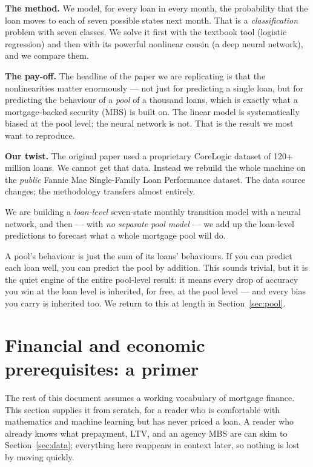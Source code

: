 \documentclass[11pt]{article}
\begin{document}
\textbf{The method.} We model, for every loan in every month, the probability that the
loan moves to each of seven possible states next month. That is a \emph{classification}
problem with seven classes. We solve it first with the textbook tool (logistic
regression) and then with its powerful nonlinear cousin (a deep neural network), and we
compare them.

\textbf{The pay-off.} The headline of the paper we are replicating is that the
nonlinearities matter enormously --- not just for predicting a single loan, but for
predicting the behaviour of a \emph{pool} of a thousand loans, which is exactly what a
mortgage-backed security (MBS) is built on. The linear model is systematically biased at
the pool level; the neural network is not. That is the result we most want to reproduce.

\textbf{Our twist.} The original paper used a proprietary CoreLogic dataset of 120+
million loans. We cannot get that data. Instead we rebuild the whole machine on the
\emph{public} Fannie Mae Single-Family Loan Performance dataset. The data source changes;
the methodology transfers almost entirely.

\begin{keyidea}
We are building a \emph{loan-level} seven-state monthly transition model with a neural
network, and then --- with \emph{no separate pool model} --- we add up the loan-level
predictions to forecast what a whole mortgage pool will do.
\end{keyidea}

\begin{intuition}
A pool's behaviour is just the sum of its loans' behaviours. If you can predict each
loan well, you can predict the pool by addition. This sounds trivial, but it is the
quiet engine of the entire pool-level result: it means every drop of accuracy you win
at the loan level is inherited, for free, at the pool level --- and every bias you carry
is inherited too. We return to this at length in Section~\ref{sec:pool}.
\end{intuition}

\section{Financial and economic prerequisites: a primer}
\label{sec:primer}

The rest of this document assumes a working vocabulary of mortgage finance. This section
supplies it from scratch, for a reader who is comfortable with mathematics and machine
learning but has never priced a loan. A reader who already knows what prepayment, LTV, and
an agency MBS are can skim to Section~\ref{sec:data}; everything here reappears in context
later, so nothing is lost by moving quickly.
\end{document}
